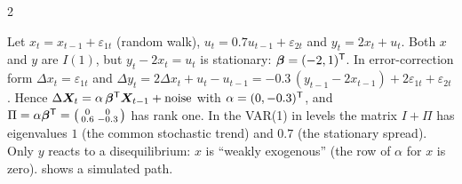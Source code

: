 \begin{paracol}{2}
\begin{example}\label{ch09:ex-coint}
Let $x_t=x_{t-1}+\varepsilon_{1t}$ (random walk), $u_t=0.7u_{t-1}+\varepsilon_{2t}$ and $y_t=2x_t+u_t$. Both $x$ and $y$ are $I(1)$, but $y_t-2x_t=u_t$ is
stationary: $\bm\beta=(-2,1)^{\mathsf T}$. In error-correction form
$\Delta x_t=\varepsilon_{1t}$ and $\Delta y_t=2\Delta x_t+u_t-u_{t-1}=-0.3\,(y_{t-1}-2x_{t-1})+2\varepsilon_{1t}+\varepsilon_{2t}$. Hence
$\Delta\bm X_t=\alpha\,\bm\beta^{\mathsf T}\bm X_{t-1}+\text{noise}$ with $\alpha=(0,-0.3)^{\mathsf T}$, and $\Pi=\alpha\bm\beta^{\mathsf T}=\bigl(\begin{smallmatrix}0&0\\0.6&-0.3\end{smallmatrix}\bigr)$
has rank one. In the VAR(1) in levels the matrix $I+\Pi$ has eigenvalues $1$ (the common stochastic trend) and $0.7$ (the stationary spread).
Only $y$ reacts to a disequilibrium: $x$ is ``weakly exogenous'' (the row of $\alpha$ for $x$ is zero).  shows a simulated path.
\end{example}


\end{paracol}
